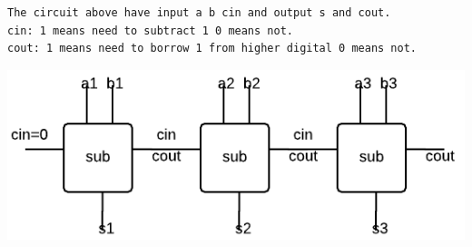\documentclass[10pt,twoside,a4paper]{article}
\begin{document}
\begin{verbatim}
The circuit above have input a b cin and output s and cout.
cin: 1 means need to subtract 1 0 means not.
cout: 1 means need to borrow 1 from higher digital 0 means not.
\end{verbatim}
\includegraphics[scale=1]{6(2).png} 
\end{document}
